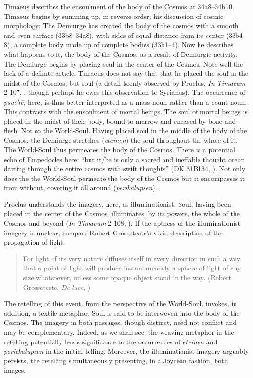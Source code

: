 Timaeus describes the ensoulment of the body of the Cosmos at 34a8--34b10. Timae\-us begins by summing up, in reverse order, his discussion of cosmic morphology: The Demiurge has created the body of the cosmos with a smooth and even surface (33b8--34a8), with sides of equal distance from its center (33b4--8), a complete body made up of complete bodies (33b1--4). Now he describes what happens to it, the body of the Cosmos, as a result of Demiurgic activity. The Demiurge begins by placing soul in the center of the Cosmos. Note well the lack of a definite article. Timaeus does not say that that he placed the soul in the midst of the Cosmos, but soul (a detail keenly observed by Proclus, \emph{In Timaeum} 2 107, \citealt{Diehl:1903re}, though perhaps he owes this observation to Syrianus). The occurrence of \emph{psuchē}, here, is thus better interpreted as a mass noun rather than a count noun. This contrasts with the ensoulment of mortal beings. The soul of mortal beings is placed in the midst of their body, bound to marrow and encased by bone and flesh. Not so the World-Soul. Having placed soul in the middle of the body of the Cosmos, the Demiurge stretches (\emph{eteinen}) the soul throughout the whole of it. The World-Soul thus permeates the body of the Cosmos. There is a potential echo of Empedocles here: ``but it/he is only a sacred and ineffable thought organ darting through the entire cosmos with swift thoughts'' (DK 31B134, \citealt[263]{Inwood:2001ve}). Not only does the the World-Soul permeate the body of the Cosmos but it encompasses it from without, covering it all around (\emph{perikalupsen}). 

Proclus understands the imagery, here, as illuminationist. Soul, having been placed in the center of the Cosmos, illuminates, by its powers, the whole of the Cosmos and beyond (\emph{In Timaeum} 2 108, \citealt{Diehl:1903re}). If the aptness of the illuminationist imagery is unclear, compare Robert Grosseteste's vivid description of the propagation of light:
\begin{quote}
	For light of its very nature diffuses itself in every direction in such a way that a point of light will produce instantaneously a sphere of light of any size whatsoever, unless some opaque object stand in the way. (Robert Grosseteste, \emph{De luce}, \citealt[10]{Riedl:1942it})
\end{quote}
The retelling of this event, from the perspective of the World-Soul, invokes, in addition, a textile metaphor. Soul is said to be interwoven into the body of the Cosmos. The imagery in both passages, though distinct, need not conflict and may be complementary. Indeed, as we shall see, the weaving metaphor in the retelling potentially lends significance to the occurrences of \emph{eteinen} and \emph{periekalupsen} in the initial telling. Moreover, the illuminationist imagery arguably persists, the retelling simultaneously presenting, in a Joycean fashion, both images.

